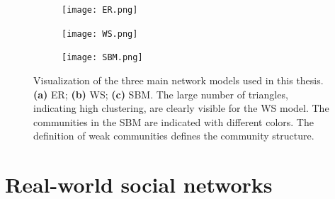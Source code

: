 \documentclass[11 pt , letterpaper , twoside , openright]{book}
\begin{document}
\begin{figure}[H]
  \begin{subfigure}[b]{0.32\textwidth}
    \caption{}
    \texttt{[image: ER.png]}
  \end{subfigure}
  \begin{subfigure}[b]{0.32\textwidth}
    \caption{}
    \texttt{[image: WS.png]}
  \end{subfigure}
  \begin{subfigure}[b]{0.32\textwidth}
    \caption{}
    \texttt{[image: SBM.png]}
  \end{subfigure}
  \captionsetup{format=plain}
  \caption[Visualization of the three main network models used in this thesis; (i) ER; (ii) WS and (iii) SBM.]{Visualization of the three main network models used in this thesis. \textbf{(a)} ER; \textbf{(b)} WS; \textbf{(c)} SBM. The large number of triangles, indicating high clustering, are clearly visible for the WS model. The communities in the SBM are indicated with different colors. The definition of weak communities defines the community structure.}
\label{netRepr}
\end{figure}

\section{Real-world social networks}\label{realWorld}
\end{document}
